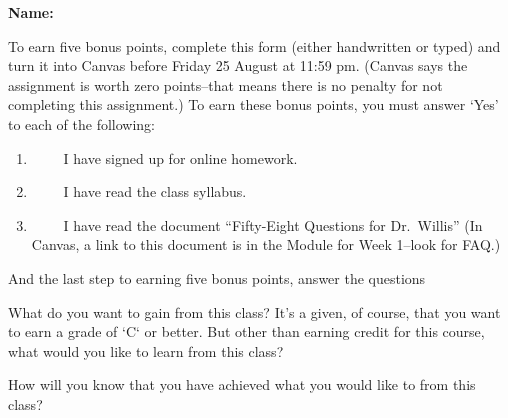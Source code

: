 \documentclass[12pt,fleqn]{exam}
\newcommand\PM{{\sc pm}}
\newcommand{\term}{Fall}
\begin{document}
\large
\vspace{0.1in}
\noindent{}
{\bf Name:}  \\
\noindent \makebox[3.0truein][l]{\bf Bonus Homework  \term \/ \the\year}
\vspace{0.1in}

\noindent  To earn five bonus points, complete this form (either handwritten or typed) and turn it into Canvas before 
Friday 25 August  at 11:59 \PM.  (Canvas says the assignment is worth zero points--that means there is no penalty for
not completing this assignment.) To earn these bonus points, you must answer `Yes' to each of the following:

\begin{enumerate}

\item \underline{$\phantom{YES}$} I have signed up for online homework. 
 
\item \underline{$\phantom{YES}$} I have read the class syllabus.

\item  \underline{$\phantom{YES}$} I have read the document ``Fifty-Eight Questions for Dr.\ Willis''  (In Canvas, a link to this
document is in the Module for Week 1--look for FAQ.)

\end{enumerate}
And the last step to earning five bonus points, answer the questions

\begin{questions}

\question What do you want to gain from this class?  It's a given, of course, that you want to earn a grade of `C` or better. But other than earning credit for this course, what would you like to learn from this class?

\begin{solution}[1.5in]

\end{solution}

\question How will you know that you have achieved what you would like to from this class?  
\end{questions}
\end{document}
